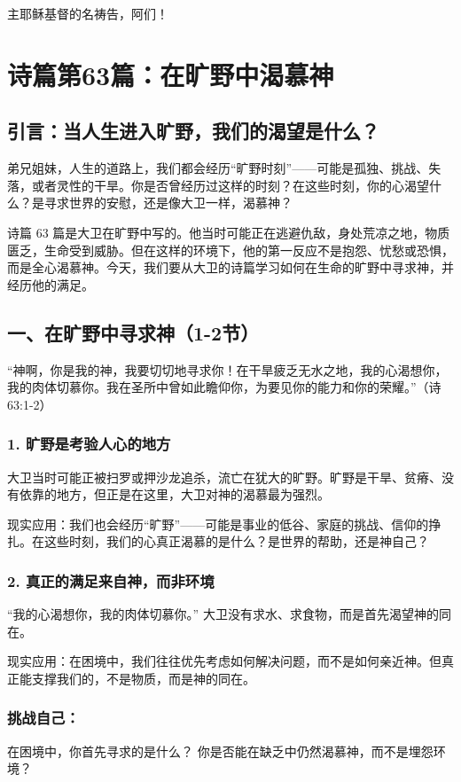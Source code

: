 \documentclass[a4paper, 12pt]{article}
\begin{document}
主耶稣基督的名祷告，阿们！
\newpage
\section{诗篇第63篇：在旷野中渴慕神}
\subsection*{引言：当人生进入旷野，我们的渴望是什么？}
\hspace{0.6cm}弟兄姐妹，人生的道路上，我们都会经历“旷野时刻”——可能是孤独、挑战、失落，或者灵性的干旱。你是否曾经历过这样的时刻？在这些时刻，你的心渴望什么？是寻求世界的安慰，还是像大卫一样，渴慕神？

诗篇 63 篇是大卫在旷野中写的。他当时可能正在逃避仇敌，身处荒凉之地，物质匮乏，生命受到威胁。但在这样的环境下，他的第一反应不是抱怨、忧愁或恐惧，而是全心渴慕神。今天，我们要从大卫的诗篇学习如何在生命的旷野中寻求神，并经历他的满足。

\subsection*{一、在旷野中寻求神（1-2节）}
“神啊，你是我的神，我要切切地寻求你！在干旱疲乏无水之地，我的心渴想你，我的肉体切慕你。我在圣所中曾如此瞻仰你，为要见你的能力和你的荣耀。”（诗 63:1-2）

\subsubsection*{1. 旷野是考验人心的地方}
\hspace{0.6cm}大卫当时可能正被扫罗或押沙龙追杀，流亡在犹大的旷野。旷野是干旱、贫瘠、没有依靠的地方，但正是在这里，大卫对神的渴慕最为强烈。

现实应用：我们也会经历“旷野”——可能是事业的低谷、家庭的挑战、信仰的挣扎。在这些时刻，我们的心真正渴慕的是什么？是世界的帮助，还是神自己？
\subsubsection*{2. 真正的满足来自神，而非环境}
“我的心渴想你，我的肉体切慕你。” 大卫没有求水、求食物，而是首先渴望神的同在。

现实应用：在困境中，我们往往优先考虑如何解决问题，而不是如何亲近神。但真正能支撑我们的，不是物质，而是神的同在。
\subsubsection*{挑战自己：}
在困境中，你首先寻求的是什么？
你是否能在缺乏中仍然渴慕神，而不是埋怨环境？
\end{document}
